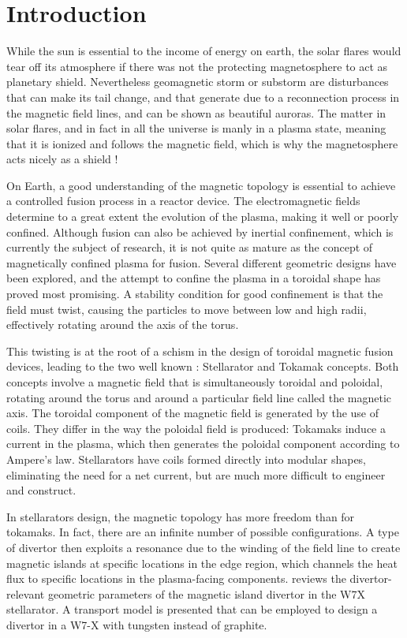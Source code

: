 
\cleardoublepage
\chapter*{Introduction}

While the sun is essential to the income of energy on earth, the solar flares would tear off its atmosphere if there was not the protecting magnetosphere to act as planetary shield. Nevertheless geomagnetic storm or substorm are disturbances that can make its tail change, and that generate due to a reconnection process in the magnetic field lines, and can be shown as beautiful auroras. The matter in solar flares, and in fact in all the universe is manly in a plasma state, meaning that it is ionized and follows the magnetic field, which is why the magnetosphere acts nicely as a shield !

On Earth, a good understanding of the magnetic topology is essential to achieve a controlled fusion process in a reactor device. The electromagnetic fields determine to a great extent the evolution of the plasma, making it well or poorly confined. Although fusion can also be achieved by inertial confinement, which is currently the subject of research, it is not quite as mature as the concept of magnetically confined plasma for fusion. Several different geometric designs have been explored, and the attempt to confine the plasma in a toroidal shape has proved most promising. A stability condition for good confinement is that the field must twist, causing the particles to move between low and high radii, effectively rotating around the axis of the torus. 

This twisting is at the root of a schism in the design of toroidal magnetic fusion devices, leading to the two well known : Stellarator and Tokamak concepts. Both concepts involve a magnetic field that is simultaneously toroidal and poloidal, rotating around the torus and around a particular field line called the magnetic axis. The toroidal component of the magnetic field is generated by the use of coils. They differ in the way the poloidal field is produced: Tokamaks induce a current in the plasma, which then generates the poloidal component according to Ampere's law. Stellarators have coils formed directly into modular shapes, eliminating the need for a net current, but are much more difficult to engineer and construct.


In stellarators design, the magnetic topology has more freedom than for tokamaks. In fact, there are an infinite number of possible configurations. A type of divertor then exploits a resonance due to the winding of the field line to create magnetic islands at specific locations in the edge region, which channels the heat flux to specific locations in the plasma-facing components. \cite{feng_review_2022} reviews the divertor-relevant geometric parameters of the magnetic island divertor in the W7X stellarator. A transport model is presented that can be employed to design a divertor in a W7-X with tungsten instead of graphite. 

